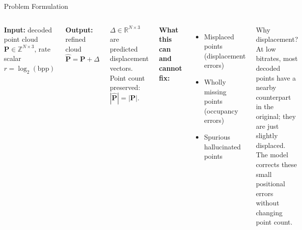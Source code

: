\documentclass[aspectratio=169]{beamer}
\begin{document}
\begin{frame}{Problem Formulation}
  \begin{columns}[T]
    \textbf{Input:} decoded point cloud $\mathbf{P} \in \mathbb{Z}^{N\times3}$,
    rate scalar $r = \log_2(\mathrm{bpp})$

    \vspace{8pt}
    \textbf{Output:} refined cloud $\hat{\mathbf{P}} = \mathbf{P} + \Delta$

    \vspace{4pt}
    $\Delta \in \mathbb{R}^{N\times3}$ are predicted displacement vectors.\\
    Point count preserved: $|\hat{\mathbf{P}}| = |\mathbf{P}|$.

    \vspace{8pt}
    \textbf{What this can and cannot fix:}
    \begin{itemize}
      \item[\checkmark] Misplaced points (displacement errors)
      \item[$\times$] Wholly missing points (occupancy errors)
      \item[$\times$] Spurious hallucinated points
    \end{itemize}

    \begin{block}{Why displacement?}
      \small
      At low bitrates, most decoded points have a nearby counterpart in the
      original; they are just slightly displaced. The model corrects these
      small positional errors without changing point count.
    \end{block}
  \end{columns}
\end{frame}
\end{document}
